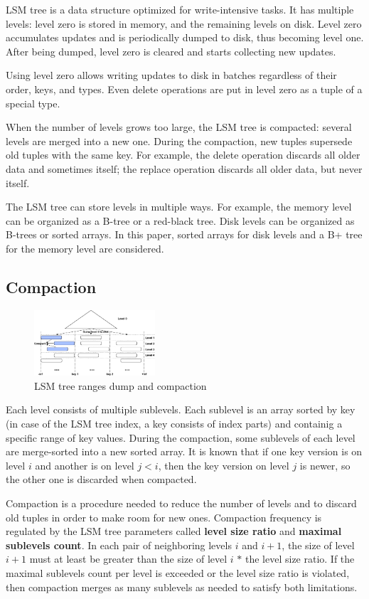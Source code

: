 \documentclass{vldb}
\begin{document}
LSM tree is a data structure optimized for write-intensive tasks. It has
multiple levels: level zero is stored in memory, and the remaining levels on disk.
Level zero accumulates updates and is periodically dumped to disk, thus becoming
level one. After being dumped, level zero is cleared and starts collecting new updates.

Using level zero allows writing updates to disk in batches regardless of
their order, keys, and types. Even delete operations are put in level zero as a tuple of a
special type.

When the number of levels grows too large, the LSM tree is compacted: several levels are
merged into a new one. During the compaction, new tuples supersede old tuples with the same
key. For example, the delete operation discards all older data and sometimes itself; the replace
operation discards all older data, but never itself.

The LSM tree can store levels in multiple ways. For example, the memory level can be
organized as a B-tree or a red-black tree. Disk levels can be organized as B-trees or sorted
arrays. In this paper, sorted arrays for disk levels and a B+ tree for the memory level
are considered.

\subsection{Compaction}
\begin{figure}
\centering
\includegraphics[width=0.4\textwidth]{compaction_schema}
\caption{LSM tree ranges dump and compaction}
\label{fig:compaction_schema}
\end{figure}
Each level consists of multiple sublevels. Each sublevel is an array sorted by
key (in case of the LSM tree index, a key consists of index parts) and
containig a specific range of key values. During the compaction, some sublevels of each
level are merge-sorted into a new sorted array. It is known that if one key
version is on level $i$ and another is on level $j < i$, then the key version on level
$j$ is newer, so the other one is discarded when compacted.

Compaction is a procedure needed to reduce the number of levels and to discard old tuples
in order to make room for new ones. Compaction frequency is regulated by the LSM tree
parameters called \textbf{level size ratio} and \textbf{maximal sublevels count}. In each pair of
neighboring levels $i$ and $i + 1$, the size of level $i + 1$ must at least be greater than
the size of level $i$ $*$ the level size ratio. If the maximal sublevels count per
level is exceeded or the level size ratio is violated, then compaction merges as many
sublevels as needed to satisfy both limitations.
\end{document}

